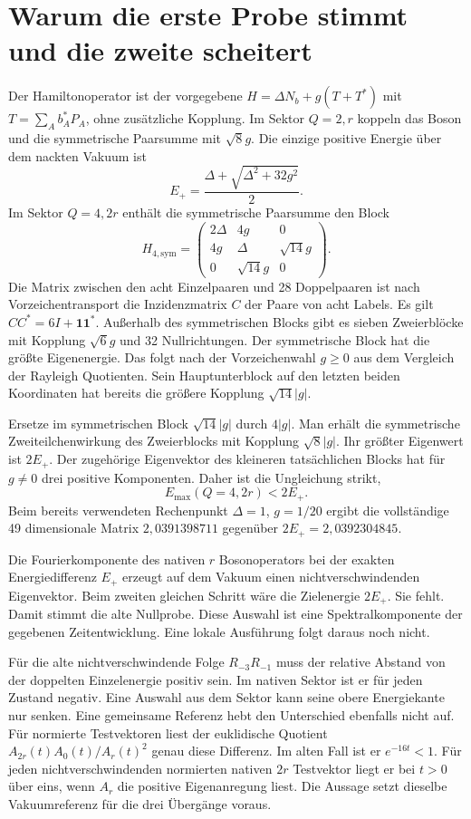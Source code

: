 \documentclass[11pt,a4paper]{article}
\begin{document}
\section*{Warum die erste Probe stimmt und die zweite scheitert}
Der Hamiltonoperator ist der vorgegebene $H=\Delta N_b+g(T+T^*)$ mit $T=\sum_A b_A^*P_A$, ohne zusätzliche Kopplung. Im Sektor $Q=2,r$ koppeln das Boson und die symmetrische Paarsumme mit $\sqrt{8}g$. Die einzige positive Energie über dem nackten Vakuum ist
\[
 E_+=\frac{\Delta+\sqrt{\Delta^2+32g^2}}2 .
\]
Im Sektor $Q=4,2r$ enthält die symmetrische Paarsumme den Block
\[
 H_{4,\mathrm{sym}}=
 \begin{pmatrix}
 2\Delta & 4g & 0\\
 4g & \Delta & \sqrt{14}g\\
 0 & \sqrt{14}g & 0
 \end{pmatrix}.
\]
Die Matrix zwischen den acht Einzelpaaren und 28 Doppelpaaren ist nach Vorzeichentransport die Inzidenzmatrix $C$ der Paare von acht Labels. Es gilt $CC^*=6I+\mathbf 1\mathbf 1^*$. Außerhalb des symmetrischen Blocks gibt es sieben Zweierblöcke mit Kopplung $\sqrt 6 g$ und 32 Nullrichtungen. Der symmetrische Block hat die größte Eigenenergie. Das folgt nach der Vorzeichenwahl $g\ge0$ aus dem Vergleich der Rayleigh Quotienten. Sein Hauptunterblock auf den letzten beiden Koordinaten hat bereits die größere Kopplung $\sqrt{14}|g|$.

Ersetze im symmetrischen Block $\sqrt{14}|g|$ durch $4|g|$. Man erhält die symmetrische Zweiteilchenwirkung des Zweierblocks mit Kopplung $\sqrt{8}|g|$. Ihr größter Eigenwert ist $2E_+$. Der zugehörige Eigenvektor des kleineren tatsächlichen Blocks hat für $g\ne0$ drei positive Komponenten. Daher ist die Ungleichung strikt,
\[
 E_{\max}(Q=4,2r)<2E_+ .
\]
Beim bereits verwendeten Rechenpunkt $\Delta=1$, $g=1/20$ ergibt die vollständige 49 dimensionale Matrix $2{,}0391398711$ gegenüber $2E_+=2{,}0392304845$.

Die Fourierkomponente des nativen $r$ Bosonoperators bei der exakten Energiedifferenz $E_+$ erzeugt auf dem Vakuum einen nichtverschwindenden Eigenvektor. Beim zweiten gleichen Schritt wäre die Zielenergie $2E_+$. Sie fehlt. Damit stimmt die alte Nullprobe. Diese Auswahl ist eine Spektralkomponente der gegebenen Zeitentwicklung. Eine lokale Ausführung folgt daraus noch nicht.

Für die alte nichtverschwindende Folge $R_{-3}R_{-1}$ muss der relative Abstand von der doppelten Einzelenergie positiv sein. Im nativen Sektor ist er für jeden Zustand negativ. Eine Auswahl aus dem Sektor kann seine obere Energiekante nur senken. Eine gemeinsame Referenz hebt den Unterschied ebenfalls nicht auf. Für normierte Testvektoren liest der euklidische Quotient $A_{2r}(t) A_0(t)/A_r(t)^2$ genau diese Differenz. Im alten Fall ist er $e^{-16t}<1$. Für jeden nichtverschwindenden normierten nativen $2r$ Testvektor liegt er bei $t>0$ über eins, wenn $A_r$ die positive Eigenanregung liest. Die Aussage setzt dieselbe Vakuumreferenz für die drei Übergänge voraus.
\end{document}

